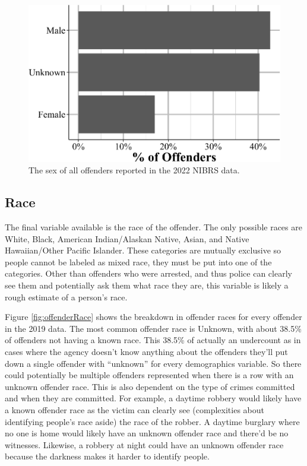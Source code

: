 \documentclass[
  12pt,
  openany]{book}
\begin{document}
\begin{figure}

{\centering \includegraphics[width=0.9\linewidth]{14_nibrs_offender_files/figure-latex/offenderSex-1} 

}

\caption{The sex of all offenders reported in the 2022 NIBRS data.}\label{fig:offenderSex}
\end{figure}

\subsection{Race}\label{race-2}

The final variable available is the race of the offender. The only possible races are White, Black, American Indian/Alaskan Native, Asian, and Native Hawaiian/Other Pacific Islander. These categories are mutually exclusive so people cannot be labeled as mixed race, they must be put into one of the categories. Other than offenders who were arrested, and thus police can clearly see them and potentially ask them what race they are, this variable is likely a rough estimate of a person's race.

Figure \ref{fig:offenderRace} shows the breakdown in offender races for every offender in the 2019 data. The most common offender race is Unknown, with about 38.5\% of offenders not having a known race. This 38.5\% of actually an undercount as in cases where the agency doesn't know anything about the offenders they'll put down a single offender with ``unknown'' for every demographics variable. So there could potentially be multiple offenders represented when there is a row with an unknown offender race. This is also dependent on the type of crimes committed and when they are committed. For example, a daytime robbery would likely have a known offender race as the victim can clearly see (complexities about identifying people's race aside) the race of the robber. A daytime burglary where no one is home would likely have an unknown offender race and there'd be no witnesses. Likewise, a robbery at night could have an unknown offender race because the darkness makes it harder to identify people.
\end{document}
